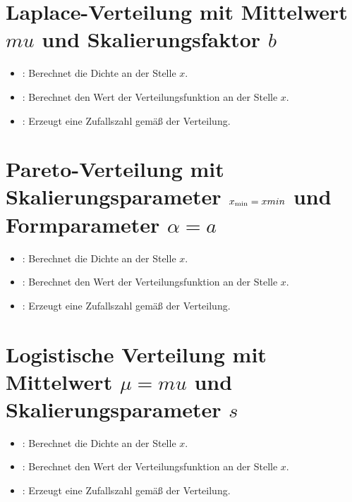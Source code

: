 \section{Laplace-Verteilung mit Mittelwert \texorpdfstring{$mu$}{mu} und Skalierungsfaktor \texorpdfstring{$b$}{b}}

\begin{itemize}

\item
{}:
Berechnet die Dichte an der Stelle $x$.

\item
{}:
Berechnet den Wert der Verteilungsfunktion an der Stelle $x$.

\item
{}:
Erzeugt eine Zufallszahl gemäß der Verteilung.

\end{itemize}



\section{Pareto-Verteilung mit Skalierungsparameter \texorpdfstring{$x_{\rm min}=xmin$}{xmin} und Formparameter \texorpdfstring{$\alpha=a$}{a}}

\begin{itemize}

\item
{}:
Berechnet die Dichte an der Stelle $x$.

\item
{}:
Berechnet den Wert der Verteilungsfunktion an der Stelle $x$.

\item
{}:
Erzeugt eine Zufallszahl gemäß der Verteilung.

\end{itemize}



\section{Logistische Verteilung mit Mittelwert \texorpdfstring{$\mu=mu$}{mu} und Skalierungsparameter \texorpdfstring{$s$}{s}}

\begin{itemize}

\item
{}:
Berechnet die Dichte an der Stelle $x$.

\item
{}:
Berechnet den Wert der Verteilungsfunktion an der Stelle $x$.

\item
{}:
Erzeugt eine Zufallszahl gemäß der Verteilung.

\end{itemize}


